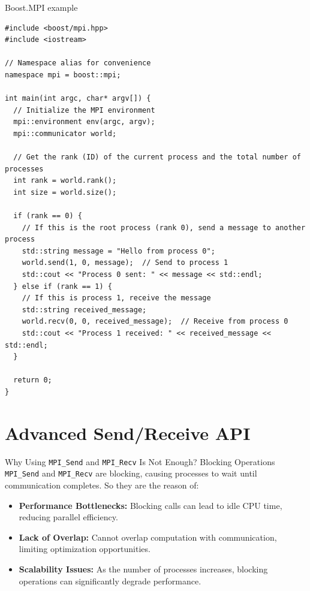 \documentclass{beamer}
\begin{document}
\begin{frame}[fragile]{Boost.MPI example}
  \lstset{style=CStyle, caption=Hello World example with Boost MPI}
  \begin{lstlisting}
#include <boost/mpi.hpp>
#include <iostream>

// Namespace alias for convenience
namespace mpi = boost::mpi;

int main(int argc, char* argv[]) {
  // Initialize the MPI environment
  mpi::environment env(argc, argv);
  mpi::communicator world;

  // Get the rank (ID) of the current process and the total number of processes
  int rank = world.rank();
  int size = world.size();

  if (rank == 0) {
    // If this is the root process (rank 0), send a message to another process
    std::string message = "Hello from process 0";
    world.send(1, 0, message);  // Send to process 1
    std::cout << "Process 0 sent: " << message << std::endl;
  } else if (rank == 1) {
    // If this is process 1, receive the message
    std::string received_message;
    world.recv(0, 0, received_message);  // Receive from process 0
    std::cout << "Process 1 received: " << received_message << std::endl;
  }

  return 0;
}
  \end{lstlisting}
\end{frame}

\section{Advanced Send/Receive API}

\begin{frame}{Why Using \texttt{MPI\_Send} and \texttt{MPI\_Recv} Is Not Enough?}
  Blocking Operations \texttt{MPI\_Send} and \texttt{MPI\_Recv} are blocking, causing processes to wait until communication completes.
  So they are the reason of:
  \begin{itemize}
    \item \textbf{Performance Bottlenecks:} Blocking calls can lead to idle CPU time, reducing parallel efficiency.
    \item \textbf{Lack of Overlap:} Cannot overlap computation with communication, limiting optimization opportunities.
    \item \textbf{Scalability Issues:} As the number of processes increases, blocking operations can significantly degrade performance.
  \end{itemize}
\end{frame}
\end{document}
